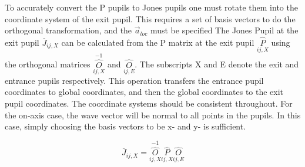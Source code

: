 \documentclass{article}
\begin{document}
	To accurately convert the P pupils to Jones pupils one must rotate them into the coordinate system of the exit pupil. This requires a set of basis vectors to do the orthogonal transformation, and the $\vec{a}_{loc}$ must be specified The Jones Pupil at the exit pupil $\overline{J}_{ij,X}$ can be calculated from the P matrix at the exit pupil $\overbrace{P}_{ij,X}$ using the orthogonal matrices $\overbrace{O}_{ij,X}^{-1}$ and $\overbrace{O}_{ij,E}$. The subscripts X and E denote the exit and entrance pupils respectively. This operation transfers the entrance pupil coordinates to global coordinates, and then the global coordinates to the exit pupil coordinates. The coordinate systems should be consistent throughout. For the on-axis case, the wave vector will be normal to all points in the pupils. In this case, simply choosing the basis vectors to be x- and y- is sufficient.
	
	\begin{equation}
		\overline{J}_{ij,X} = \overbrace{O}_{ij,X}^{-1} \overbrace{P}_{ij,X} \overbrace{O}_{ij,E}
	\end{equation}
\end{document}
